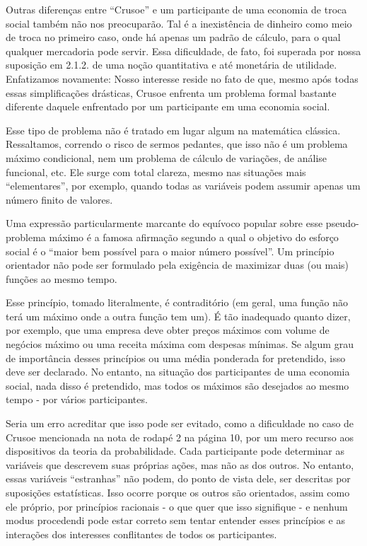 \documentclass[12pt]{article}
\begin{document}
Outras diferenças entre “Crusoe” e um participante de uma economia de troca social também não nos preocuparão. Tal é a inexistência de dinheiro como meio de troca no primeiro caso, onde há apenas um padrão de cálculo, para o qual qualquer mercadoria pode servir. Essa dificuldade, de fato, foi superada por nossa suposição em 2.1.2. de uma noção quantitativa e até monetária de utilidade. Enfatizamos novamente: Nosso interesse reside no fato de que, mesmo após todas essas simplificações drásticas, Crusoe enfrenta um problema formal bastante diferente daquele enfrentado por um participante em uma economia social.

Esse tipo de problema não é tratado em lugar algum na matemática clássica. Ressaltamos, correndo o risco de sermos pedantes, que isso não é um problema máximo condicional, nem um problema de cálculo de variações, de análise funcional, etc. Ele surge com total clareza, mesmo nas situações mais “elementares”, por exemplo, quando todas as variáveis podem assumir apenas um número finito de valores.

Uma expressão particularmente marcante do equívoco popular sobre esse pseudo-problema máximo é a famosa afirmação segundo a qual o objetivo do esforço social é o “maior bem possível para o maior número possível”. Um princípio orientador não pode ser formulado pela exigência de maximizar duas (ou mais) funções ao mesmo tempo.

Esse princípio, tomado literalmente, é contraditório (em geral, uma função não terá um máximo onde a outra função tem um). É tão inadequado quanto dizer, por exemplo, que uma empresa deve obter preços máximos com volume de negócios máximo ou uma receita máxima com despesas mínimas. Se algum grau de importância desses princípios ou uma média ponderada for pretendido, isso deve ser declarado. No entanto, na situação dos participantes de uma economia social, nada disso é pretendido, mas todos os máximos são desejados ao mesmo tempo - por vários participantes.

Seria um erro acreditar que isso pode ser evitado, como a dificuldade no caso de Crusoe mencionada na nota de rodapé 2 na página 10, por um mero recurso aos dispositivos da teoria da probabilidade. Cada participante pode determinar as variáveis que descrevem suas próprias ações, mas não as dos outros. No entanto, essas variáveis “estranhas” não podem, do ponto de vista dele, ser descritas por suposições estatísticas. Isso ocorre porque os outros são orientados, assim como ele próprio, por princípios racionais - o que quer que isso signifique - e nenhum modus procedendi pode estar correto sem tentar entender esses princípios e as interações dos interesses conflitantes de todos os participantes.
\end{document}
